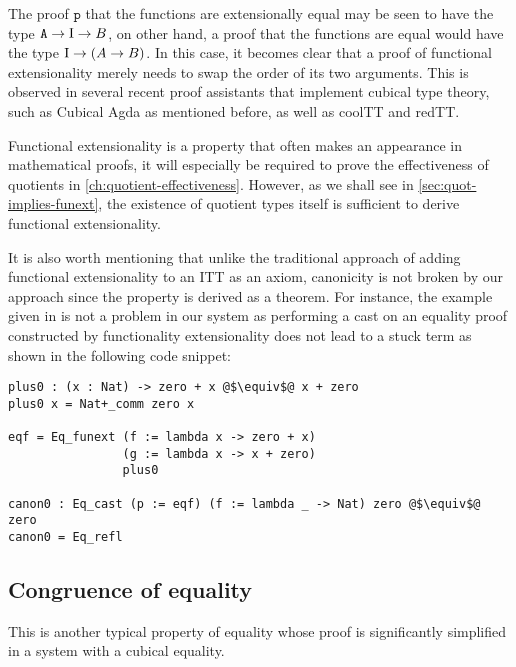 \documentclass[12pt,twoside,maitrise]{dms}
\theoremstyle{definition}
\numberwithin{equation}{section}
\numberwithin{table}{chapter}
\numberwithin{figure}{chapter}
\newcommand\id[1] {\texttt{#1}}
\begin{document}
The proof $\id{p}$ that the functions are extensionally equal may be seen to
have the type $\id{A} \rightarrow \bI \rightarrow B$, on other hand, a proof
that the functions are equal would have the type $\mathrm{I} \rightarrow (A \rightarrow
B)$. In this case, it becomes clear that a proof of functional extensionality
merely needs to swap the order of its two arguments. This is observed in several
recent proof assistants that implement cubical type theory, such as Cubical Agda
as mentioned before, as well as coolTT and redTT.\@

Functional extensionality is a property that often makes an appearance in
mathematical proofs, it will especially be required to prove the effectiveness
of quotients in \autoref{ch:quotient-effectiveness}. However, as we shall see in
\autoref{sec:quot-implies-funext}, the existence of quotient types itself is
sufficient to derive functional extensionality.

It is also worth mentioning that unlike the traditional approach of adding
functional extensionality to an ITT as an axiom, canonicity is not broken by our
approach since the property is derived as a theorem. For instance, the example
given in\cite{altenkirch2007observational} is not a problem in our system as
performing a cast on an equality proof constructed by functionality
extensionality does not lead to a stuck term as shown in the following code snippet:

\begin{verbatim}
plus0 : (x : Nat) -> zero + x @$\equiv$@ x + zero
plus0 x = Nat+_comm zero x

eqf = Eq_funext (f := lambda x -> zero + x)
                (g := lambda x -> x + zero)
                plus0

canon0 : Eq_cast (p := eqf) (f := lambda _ -> Nat) zero @$\equiv$@ zero
canon0 = Eq_refl
\end{verbatim}

\subsection*{Congruence of equality}\label{subsec:congruence-eq}
This is another typical property of equality whose proof is significantly
simplified in a system with a cubical equality.
\end{document}
